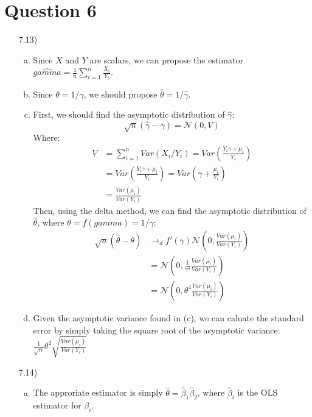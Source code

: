 \documentclass{article}
\newcommand{\N}{\mathcal{N}}
\newcommand{\est}[1]{\frac{1}{#1}\sum_{i=1}^{#1}}
\newcommand{\sumn}{\sum_{i=1}^{n}}
\newcommand{\bhat}{\hat{\beta}}
\begin{document}
\section*{Question 6}
\begin{itemize}
	\item[7.13)] 
		\begin{enumerate}[(a)]
			\item Since $X$ and $Y$ are scalars, we can propose the estimator ${\hat{gamma}=\est{n}\frac{X_i}{Y_i}}$.
			
			\item Since ${\theta=1/\gamma}$, we should propose ${\hat{\theta}=1/\hat{\gamma}}$.
			
			\item First, we should find the asymptotic distribution of $\hat{\gamma}$:
				\[
					\sqrt{n}(\hat{\gamma}-\gamma) = \N(0,V)
				\]
				Where:
				\begin{align*}
					V 	&= \sumn Var(X_i/Y_i) = Var\left(\frac{Y_i\gamma + \mu_i}{Y_i}\right)  	\\
						&= Var\left(\frac{Y_i\gamma + \mu_i}{Y_i}\right) = Var\left(\gamma + \frac{\mu_i}{Y_i}\right) 	\\
						&= \frac{Var(\mu_i)}{Var(Y_i)}
				\end{align*}
				Then, using the delta method, we can find the asymptotic distribution of $\hat{\theta}$, where ${\theta=f(gamma) = 1/\gamma}$:
				\begin{align*}
					\sqrt{n}(\hat{\theta}-\theta) 	&\rightarrow_d f'(\gamma)\N\left(0,\frac{Var(\mu_i)}{Var(Y_i)}\right)	\\
													&= \N\left(0, \frac{1}{\gamma^4}\frac{Var(\mu_i)}{Var(Y_i)}\right)		\\
													&= \N\left(0,\theta^4\frac{Var(\mu_i)}{Var(Y_i)}\right)
				\end{align*}
			
			\item Given the asymptotic variance found in (c), we can caluate the standard error by simply taking the square root of the asymptotic variance: ${\frac{1}{\sqrt{n}}\theta^2\sqrt{\frac{Var(\mu_i)}{Var(Y_i)}}}$
			
		\end{enumerate}
	
	\item[7.14)] 
		\begin{enumerate}[(a)]
			\item The approriate estimator is simply ${\hat{\theta}=\bhat_1\bhat_2}$, where $\bhat_i$ is the OLS estimator for $\beta_i$.
			

\end{enumerate}
\end{itemize}
\end{document}
